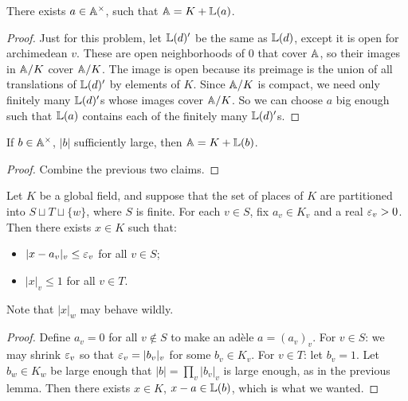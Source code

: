 \documentclass[11pt]{amsart}
\begin{document}
\begin{lem}

There exists $a\in \AA\cross$, such that $\AA = K + \LL(a)$.

\end{lem}



\begin{proof}
Just for this problem, let $\LL(d)'$ be the same as $\LL(d)$, except it is open for archimedean $v$. These are open neighborhoods of 0 that cover $\AA$, so their images in $\AA/K$ cover $\AA/K$. The image is open because its preimage is the union of all translations of $\LL(d)'$ by elements of $K$. Since $\AA/K$ is compact, we need only finitely many $\LL(d)'$s whose images cover $\AA/K$. So we can choose $a$ big enough such that $\LL(a)$ contains each of the finitely many $\LL(d)'$s.
\end{proof}

\begin{lem}
If $b\in \AA^{\times}$, $|b|$ sufficiently large, then $\AA = K + \LL(b)$. 
\end{lem}

\begin{proof}
Combine the previous two claims.
\end{proof}


\begin{thm}
Let $K$ be a global field, and suppose that the set of places of $K$ are partitioned into $S\sqcup T \sqcup \{w\}$, where $S$ is finite. For each $v\in S$, fix $a_v \in K_v$ and a real $\eps_v > 0$. Then there exists $x\in K$ such that:
\begin{itemize}
    \item $|x - a_v|_v \le \eps_v$ for all $v\in S$;
    \item $|x|_v \le 1$ for all $v\in T$.
\end{itemize}
Note that $|x|_w$ may behave wildly.
\end{thm}


\begin{proof}
Define $a_v = 0$ for all $v\notin S$ to make an ad\`ele $a = (a_v)_v$. For $v\in S$: we may shrink $\eps_v$ so that $\eps_v = |b_v|_v$ for some $b_v\in K_v$. For $v\in T$: let $b_v = 1$. Let $b_w \in K_w$ be large enough that $|b| = \prod_v |b_v|_v$ is large enough, as in the previous lemma. Then there exists $x\in K$, $x-a\in \LL(b)$, which is what we wanted.
\end{proof}
\end{document}
